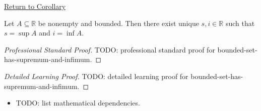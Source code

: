 \newpage
{}
\label{prf:bounded-set-has-supremum-and-infimum}

\begin{remark*}[Return]
\hyperref[cor:bounded-set-has-supremum-and-infimum]{Return to Corollary}
\end{remark*}

\begin{corollary*}
Let $A\subseteq\mathbb{R}$ be nonempty and bounded. Then there exist unique
$s,i\in\mathbb{R}$ such that $s=\sup A$ and $i=\inf A$.
\end{corollary*}

\begin{proof}[Professional Standard Proof]
\LRAProofBodyStart
TODO: professional standard proof for bounded-set-has-supremum-and-infimum.
\end{proof}

\begin{proof}[Detailed Learning Proof]
\LRAProofBodyStart
TODO: detailed learning proof for bounded-set-has-supremum-and-infimum.
\end{proof}

\begin{remark*}
\end{remark*}

\begin{dependencies}
\begin{itemize}
  \item TODO: list mathematical dependencies.
\end{itemize}
\end{dependencies}

\clearpage
